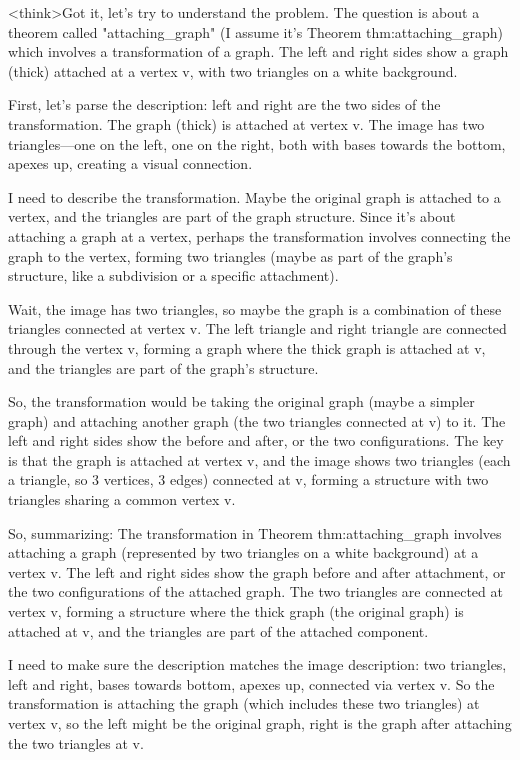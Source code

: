 <think>Got it, let's try to understand the problem. The question is about a theorem called "attaching_graph" (I assume it's Theorem thm:attaching_graph) which involves a transformation of a graph. The left and right sides show a graph (thick) attached at a vertex v, with two triangles on a white background. 

First, let's parse the description: left and right are the two sides of the transformation. The graph (thick) is attached at vertex v. The image has two triangles—one on the left, one on the right, both with bases towards the bottom, apexes up, creating a visual connection. 

I need to describe the transformation. Maybe the original graph is attached to a vertex, and the triangles are part of the graph structure. Since it's about attaching a graph at a vertex, perhaps the transformation involves connecting the graph to the vertex, forming two triangles (maybe as part of the graph's structure, like a subdivision or a specific attachment). 

Wait, the image has two triangles, so maybe the graph is a combination of these triangles connected at vertex v. The left triangle and right triangle are connected through the vertex v, forming a graph where the thick graph is attached at v, and the triangles are part of the graph's structure. 

So, the transformation would be taking the original graph (maybe a simpler graph) and attaching another graph (the two triangles connected at v) to it. The left and right sides show the before and after, or the two configurations. The key is that the graph is attached at vertex v, and the image shows two triangles (each a triangle, so 3 vertices, 3 edges) connected at v, forming a structure with two triangles sharing a common vertex v. 

So, summarizing: The transformation in Theorem thm:attaching_graph involves attaching a graph (represented by two triangles on a white background) at a vertex v. The left and right sides show the graph before and after attachment, or the two configurations of the attached graph. The two triangles are connected at vertex v, forming a structure where the thick graph (the original graph) is attached at v, and the triangles are part of the attached component. 

I need to make sure the description matches the image description: two triangles, left and right, bases towards bottom, apexes up, connected via vertex v. So the transformation is attaching the graph (which includes these two triangles) at vertex v, so the left might be the original graph, right is the graph after attaching the two triangles at v. 

